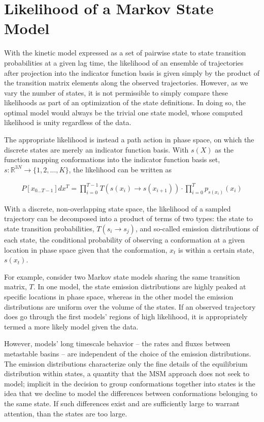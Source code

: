 \documentclass[twocolumn,floatfix,nofootinbib,aps]{revtex4-1}
\begin{document}
\section{Likelihood of a Markov State Model}
With the kinetic model expressed as a set of pairwise state to state transition probabilities at a given lag time, the likelihood of an ensemble of trajectories after projection into the indicator function basis is given simply by the product of the transition matrix elements along the observed trajectories. However, as we vary the number of states, it is not permissible to simply compare these likelihoods as part of an optimization of the state definitions. In doing so, the optimal model would always be the trivial one state model, whose computed likelihood is unity regardless of the data.

The appropriate likelihood is instead a path action in phase space, on which the discrete states are merely an indicator function basis. With $s(X)$ as the function mapping conformations into the indicator function basis set, $s : \mathbb{R}^{3N} \rightarrow \{1, 2, \ldots, K\}$, the likelihood can be written as

\begin{align}
P[x_{0...T-1}] dx^T = \prod_{i=0}^{T-1} T(s(x_i) \rightarrow s(x_{i+1})) \cdot \prod_{i=0}^{T} p_{s(x_i)}(x_{i})
\label{eq:like}
\end{align}

With a discrete, non-overlapping state space, the likelihood of a sampled trajectory can be decomposed into a product of terms of two types: the state to state transition probabilities, $T(s_i \rightarrow s_j)$, and so-called emission distributions of each state, the conditional probability of observing a conformation at a given location in phase space given that the conformation, $x_t$ is within a certain state, $s(x_t)$.

For example, consider two Markov state models sharing the same transition matrix, $T$. In one model, the state emission distributions are highly peaked at specific locations in phase space, whereas in the other model the emission distributions are uniform over the volume of the states. If an observed trajectory does go through the first models’ regions of high likelihood, it is appropriately termed a more likely model given the data.

However, models' long timescale behavior -- the rates and fluxes between metastable basins -- are independent of the choice of the emission distributions. The emission distributions characterize only the fine details of the equilibrium distribution within states, a quantity that the MSM approach does not seek to model; implicit in the decision to group conformations together into states is the idea that we decline to model the differences between conformations belonging to the same state. If such differences exist and are sufficiently large to warrant attention, than the states are too large.
\end{document}
